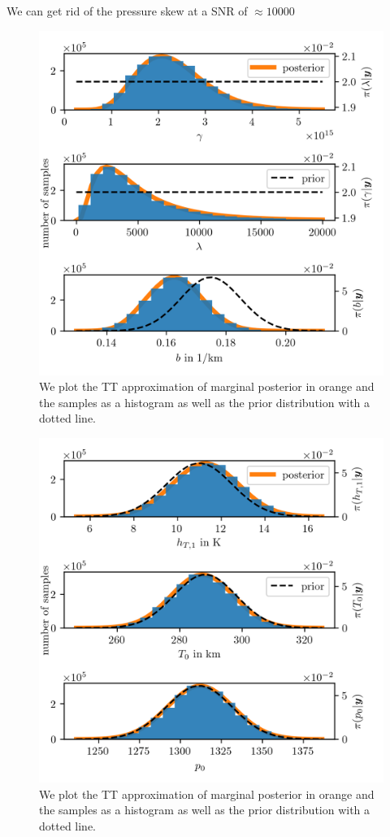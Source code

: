 We can get rid of the pressure skew at a SNR of $\approx 10000$
\begin{figure}[ht!]
	\centering
	\includegraphics{PHdPTPost0.png}
	\caption[Histograms and TT approximation of posterior distribution as well as hyper-prior distribution.]{We plot the TT approximation of marginal posterior in orange and the samples as a histogram as well as the prior distribution with a dotted line.}
	\label{fig:PostHistTT0}
\end{figure}
\begin{figure}[ht!]
	\centering
	\includegraphics{PHdPTPost1.png}
	\caption[Histograms and TT approximation of posterior distribution as well as hyper-prior distribution.]{We plot the TT approximation of marginal posterior in orange and the samples as a histogram as well as the prior distribution with a dotted line.}
	\label{fig:PostHistTT1}
\end{figure}
